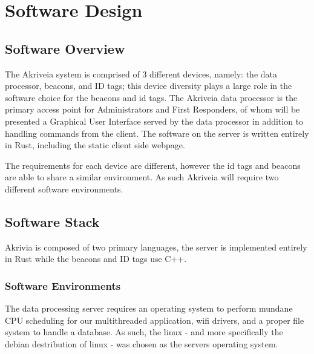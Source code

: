 

\setcounter{section}{5}
\section{Software Design}
\bigskip



\subsection{Software Overview}
The Akriveia system is comprised of 3 different devices, namely: the data processor, beacons, and ID tags; this device diversity plays a large role in the software choice for the beacons and id tags.
\smallskip
The Akriveia data processor is the primary access point for Administrators and First Responders, of whom will be presented a Graphical User Interface served by the data processor in addition to handling commands from the client.
The software on the server is written entirely in Rust, including the static client side webpage.

\smallskip
The requirements for each device are different, however the id tags and beacons are able to share a similar environment.
As such Akriveia will require two different software environments.

\bigskip
\subsection{Software Stack}
Akrivia is composed of two primary languages, the server is implemented entirely in Rust while the beacons and ID tags use C++.

\bigskip
\subsubsection{Software Environments}
The data processing server requires an operating system to perform mundane CPU scheduling for our multithreaded application, wifi drivers, and a proper file system to handle a database.
As such, the linux - and more specifically the debian destribution of linux - was chosen as the servers operating system.

